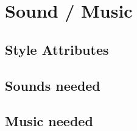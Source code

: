 \section{Sound / Music}
    \subsection{Style Attributes}
    \subsection{Sounds needed}
    \subsection{Music needed}